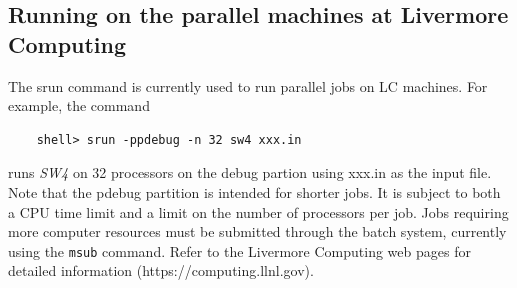 \documentclass[11pt]{report}
\begin{document}
\subsection{Running on the parallel machines at Livermore Computing}
%
The srun command is currently used to run parallel jobs on LC machines. For example, the command
\begin{verbatim}
	shell> srun -ppdebug -n 32 sw4 xxx.in
\end{verbatim}
runs \emph{SW4} on 32 processors on the debug partion using xxx.in as the input file. Note that the
pdebug partition is intended for shorter jobs. It is subject to both a CPU time limit and a limit on
the number of processors per job. Jobs requiring more computer resources must be submitted through
the batch system, currently using the \verb+msub+ command. Refer to the Livermore Computing web pages for
detailed information (https://computing.llnl.gov).



\end{document}
